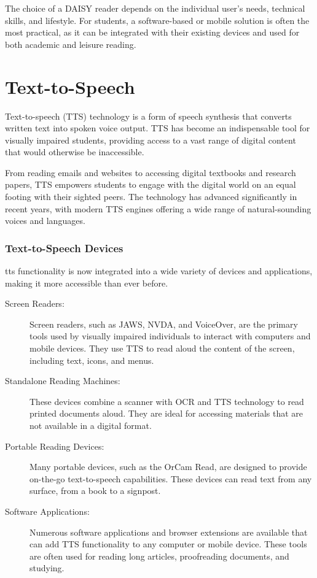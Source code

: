 The choice of a DAISY reader depends on the individual user's needs, technical skills, and lifestyle. For students, a software-based or mobile solution is often the most practical, as it can be integrated with their existing devices and used for both academic and leisure reading.\supercite{VoiceDreamReader, Bookshare}

\section{Text-to-Speech}

Text-to-speech (TTS) technology is a form of speech synthesis that converts written text into spoken voice output. TTS has become an indispensable tool for visually impaired students, providing access to a vast range of digital content that would otherwise be inaccessible.\supercite{VisionAid2025, Speechify2025}

From reading emails and websites to accessing digital textbooks and research papers, TTS empowers students to engage with the digital world on an equal footing with their sighted peers. The technology has advanced significantly in recent years, with modern TTS engines offering a wide range of natural-sounding voices and languages.\supercite{Respeecher2024}

\subsubsection{Text-to-Speech Devices}

\gls{tts} functionality is now integrated into a wide variety of devices and applications, making it more accessible than ever before.

\begin{description}
	\item[Screen Readers:] Screen readers, such as JAWS, NVDA, and VoiceOver, are the primary tools used by visually impaired individuals to interact with computers and mobile devices. They use TTS to read aloud the content of the screen, including text, icons, and menus.
	\item[Standalone Reading Machines:] These devices combine a scanner with OCR and TTS technology to read printed documents aloud. They are ideal for accessing materials that are not available in a digital format.
	\item[Portable Reading Devices:] Many portable devices, such as the OrCam Read, are designed to provide on-the-go text-to-speech capabilities. These devices can read text from any surface, from a book to a signpost.
	\item[Software Applications:] Numerous software applications and browser extensions are available that can add TTS functionality to any computer or mobile device. These tools are often used for reading long articles, proofreading documents, and studying.
\end{description}

